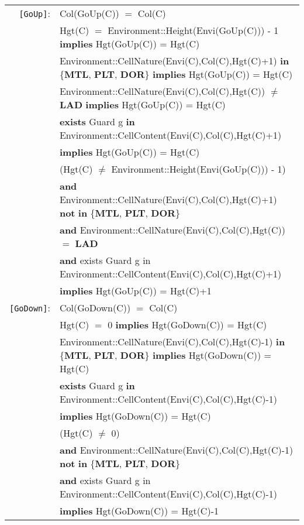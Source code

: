 \documentclass[7pt]{article}
\begin{document}
\newpage
\begin{tabular}{rl}

\texttt{[GoUp]}: & \textrm{Col(GoUp(C))} $=$ \textrm{Col(C)}\\
& \textrm{Hgt(C)} $=$ Environment::Height(Envi(GoUp(C))) - 1 \textbf{implies} \textrm{Hgt(GoUp(C))} = \textrm{Hgt(C)} \\
& \textrm{Environment::CellNature(Envi(C),Col(C),Hgt(C)+1)} \textbf{in} \{\textbf{MTL}, \textbf{PLT}, \textbf{DOR}\} \textbf{implies} \textrm{Hgt(GoUp(C))} = \textrm{Hgt(C)} \\
& \textrm{Environment::CellNature(Envi(C),Col(C),Hgt(C))} $\neq$ \textbf{LAD} \textbf{implies} \textrm{Hgt(GoUp(C))} = \textrm{Hgt(C)} \\
& \textbf{exists} \textrm{Guard} g \textbf{in} \textrm{Environment::CellContent(Envi(C),Col(C),Hgt(C)+1)} \\ & \quad\quad \textbf{implies} \textrm{Hgt(GoUp(C))} = \textrm{Hgt(C)}  \\
& (\textrm{Hgt(C)} $\neq$ Environment::Height(Envi(GoUp(C))) - 1) \\ 
&  \quad\quad \textbf{and} \textrm{Environment::CellNature(Envi(C),Col(C),Hgt(C)+1)} \textbf{not} \textbf{in} \{\textbf{MTL}, \textbf{PLT}, \textbf{DOR}\} \\ 
& \quad\quad  \textbf{and} \textrm{Environment::CellNature(Envi(C),Col(C),Hgt(C))} $=$ \textbf{LAD} \\
& \quad\quad  \textbf{and} {exists} \textrm{Guard} g {in} \textrm{Environment::CellContent(Envi(C),Col(C),Hgt(C)+1)} \\ & \quad\quad \textbf{implies} \textrm{Hgt(GoUp(C))} = \textrm{Hgt(C)}+1  \\

\texttt{[GoDown]}: & \textrm{Col(GoDown(C))} $=$ \textrm{Col(C)}\\
& \textrm{Hgt(C)} $=$ 0 \textbf{implies} \textrm{Hgt(GoDown(C))} = \textrm{Hgt(C)} \\
& \textrm{Environment::CellNature(Envi(C),Col(C),Hgt(C)-1)} \textbf{in} \{\textbf{MTL}, \textbf{PLT}, \textbf{DOR}\} \textbf{implies} \textrm{Hgt(GoDown(C))} = \textrm{Hgt(C)} \\
& \textbf{exists} \textrm{Guard} g \textbf{in} \textrm{Environment::CellContent(Envi(C),Col(C),Hgt(C)-1)} \\ & \quad\quad \textbf{implies} \textrm{Hgt(GoDown(C))} = \textrm{Hgt(C)}  \\
& (\textrm{Hgt(C)} $\neq$ 0) \\ 
&  \quad\quad \textbf{and} \textrm{Environment::CellNature(Envi(C),Col(C),Hgt(C)-1)} \textbf{not} \textbf{in} \{\textbf{MTL}, \textbf{PLT}, \textbf{DOR}\} \\ 
& \quad\quad  \textbf{and} {exists} \textrm{Guard} g {in} \textrm{Environment::CellContent(Envi(C),Col(C),Hgt(C)-1)} \\ & \quad\quad \textbf{implies} \textrm{Hgt(GoDown(C))} = \textrm{Hgt(C)}-1  \\

\end{tabular}
\end{document}
